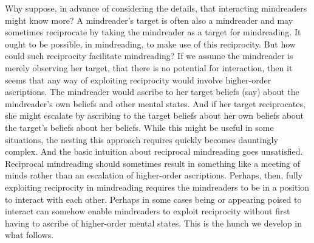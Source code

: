 \documentclass[14pt,a4paper]{extarticle}
\begin{document}
Why suppose, in advance of considering the details, that interacting mindreaders might know more?
A mindreader's target is often also a mindreader and may sometimes reciprocate by taking the mindreader as a target for mindreading.
It ought to be possible, in mindreading, to make use of this reciprocity.
But how could such reciprocity facilitate mindreading?
If we assume the mindreader is merely observing her target,
that there is no potential for interaction,
then it seems that any way of exploiting reciprocity would involve higher-order ascriptions. 
The mindreader would ascribe to her target beliefs (say) about the mindreader's own beliefs and other mental states.
And if her target reciprocates, she might escalate by ascribing to the target beliefs about her own beliefs about the target's beliefs about her beliefs.
While this might be useful in some situations, 
the nesting this approach requires quickly becomes dauntingly complex.
And the basic intuition about reciprocal mindreading goes unsatisfied.
Reciprocal mindreading should sometimes result in 
something like a meeting of minds
rather than
an escalation of higher-order ascriptions.
Perhaps, then, fully exploiting reciprocity in mindreading
requires the mindreaders to be in a position to interact with each other.
Perhaps in some cases 
being or appearing poised to interact
can somehow enable mindreaders to exploit reciprocity without first having to ascribe of higher-order mental states.
This is the hunch we develop in what follows.
\end{document}
